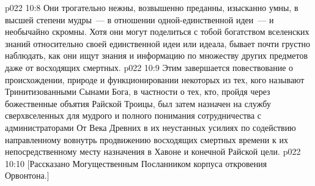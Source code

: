 \vs p022 10:8 Они трогательно нежны, возвышенно преданны, изысканно умны, в высшей степени мудры~--- в отношении одной\hyp{}единственной идеи~--- и необычайно скромны. Хотя они могут поделиться с тобой богатством вселенских знаний относительно своей единственной идеи или идеала, бывает почти грустно наблюдать, как они ищут знания и информацию по множеству других предметов даже от восходящих смертных.
\vs p022 10:9 \pc Этим завершается повествование о происхождении, природе и функционировании некоторых из тех, кого называют Тринитизованными Сынами Бога, в частности о тех, кто, пройдя через божественные объятия Райской Троицы, был затем назначен на службу сверхвселенных для мудрого и полного понимания сотрудничества с администраторами От Века Древних в их неустанных усилиях по содействию направленному вовнутрь продвижению восходящих смертных времени к их непосредственному месту назначения в Хавоне и конечной Райской цели.
\vsetoff
\vs p022 10:10 [Рассказано Могущественным Посланником корпуса откровения Орвонтона.]
\quizlink
